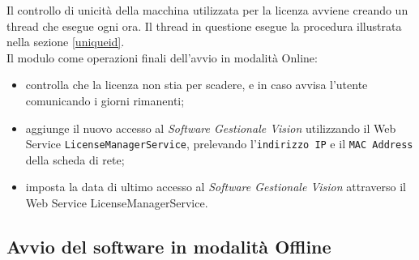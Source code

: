 Il controllo di unicità della macchina utilizzata per la licenza avviene creando un \gls{thread} che esegue ogni ora. Il thread in questione esegue la procedura illustrata nella sezione \ref{uniqueid}.\\

Il modulo come operazioni finali dell’avvio in modalità Online: 
\begin{itemize}

\item controlla che la licenza non stia per scadere, e in caso avvisa l’utente comunicando i giorni rimanenti;
\item aggiunge il nuovo accesso al \textit{Software Gestionale Vision} utilizzando il Web Service \texttt{LicenseManagerService}, prelevando l'\texttt{indirizzo IP} e il \texttt{MAC Address} della scheda di rete;
\item imposta la data di ultimo accesso al \textit{Software Gestionale Vision} attraverso il Web Service LicenseManagerService.

\end{itemize}

\subsection{Avvio del software in modalità Offline}
\label{off}

